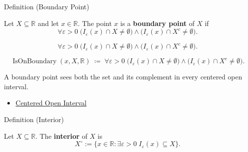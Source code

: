 \begin{definitionbox}{Definition (Boundary Point)}
\begin{definition}
\label{def:boundary-point-r}
Let $X\subseteq\mathbb{R}$ and let $x\in\mathbb{R}$. The point $x$ is
a \textbf{boundary point} of $X$ if
\[
  \forall\varepsilon>0\;\bigl(I_\varepsilon(x)\cap X\neq\emptyset\bigr)
  \wedge\bigl(I_\varepsilon(x)\cap X^c\neq\emptyset\bigr).
\]
\end{definition}
\end{definitionbox}

\begin{remark*}
\[
  \forall\varepsilon>0\;\bigl(I_\varepsilon(x)\cap X\neq\emptyset\bigr)
  \wedge\bigl(I_\varepsilon(x)\cap X^c\neq\emptyset\bigr).
\]
\end{remark*}

\begin{remark*}
\[
  \operatorname{IsOnBoundary}(x,X,\mathbb{R})\;\coloneqq\;
  \forall\varepsilon>0\;\bigl(I_\varepsilon(x)\cap X\neq\emptyset\bigr)
  \wedge\bigl(I_\varepsilon(x)\cap X^c\neq\emptyset\bigr).
\]
\end{remark*}

\begin{remark*}[Interpretation]
A boundary point sees both the set and its complement in every
centered open interval.
\end{remark*}

\begin{dependencies}
\begin{itemize}
  \item \hyperref[def:epsilon-neighbourhood]{Centered Open Interval}
\end{itemize}
\end{dependencies}

\begin{definitionbox}{Definition (Interior)}
\begin{definition}[Interior]
\label{def:interior-r}
Let $X\subseteq\mathbb{R}$. The \textbf{interior} of $X$ is
\[
  X^\circ:=\{x\in\mathbb{R}:\exists\varepsilon>0\;I_\varepsilon(x)\subseteq X\}.
\]
\end{definition}
\end{definitionbox}


